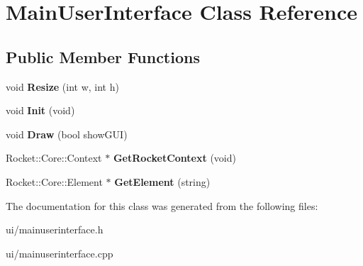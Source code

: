 \hypertarget{classMainUserInterface}{\section{\-Main\-User\-Interface \-Class \-Reference}
\label{classMainUserInterface}
}
\subsection*{\-Public \-Member \-Functions}
\begin{DoxyCompactItemize}
\item 
\hypertarget{classMainUserInterface_a46d6efc8a4f6a5796588cb1eb6ba3033}{void {\bfseries \-Resize} (int w, int h)}\label{classMainUserInterface_a46d6efc8a4f6a5796588cb1eb6ba3033}

\item 
\hypertarget{classMainUserInterface_ab31307014bcca25feabdbdcd30fdffe7}{void {\bfseries \-Init} (void)}\label{classMainUserInterface_ab31307014bcca25feabdbdcd30fdffe7}

\item 
\hypertarget{classMainUserInterface_a3400e5837dcb2c0a4f53ec48a10e205c}{void {\bfseries \-Draw} (bool show\-G\-U\-I)}\label{classMainUserInterface_a3400e5837dcb2c0a4f53ec48a10e205c}

\item 
\hypertarget{classMainUserInterface_af930a1f36f0300722f9be27d6734fab8}{\-Rocket\-::\-Core\-::\-Context $\ast$ {\bfseries \-Get\-Rocket\-Context} (void)}\label{classMainUserInterface_af930a1f36f0300722f9be27d6734fab8}

\item 
\hypertarget{classMainUserInterface_addbc9466b25233e15aa9e024cc4285f6}{\-Rocket\-::\-Core\-::\-Element $\ast$ {\bfseries \-Get\-Element} (string)}\label{classMainUserInterface_addbc9466b25233e15aa9e024cc4285f6}

\end{DoxyCompactItemize}


\-The documentation for this class was generated from the following files\-:\begin{DoxyCompactItemize}
\item 
ui/mainuserinterface.\-h\item 
ui/mainuserinterface.\-cpp\end{DoxyCompactItemize}
